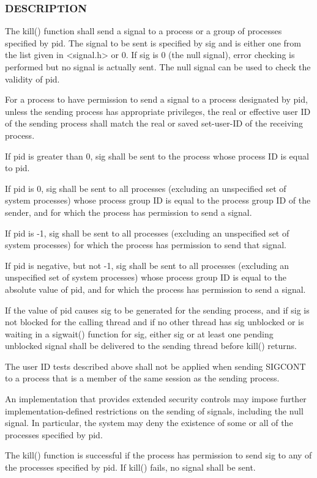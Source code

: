 \subsubsection*{D\+E\+S\+C\+R\+I\+P\+T\+I\+ON}

\begin{DoxyVerb}The kill() function shall send a signal to a process or a group of
processes specified by pid. The signal to be sent is specified by sig
and is either one from the list given in <signal.h> or 0. If sig is 0
(the null signal), error checking is performed but no signal is actually
sent. The null signal can be used to check the validity of pid.

For a process to have permission to send a signal to a process designated
by pid, unless the sending process has appropriate privileges, the real
or effective user ID of the sending process shall match the real or
saved set-user-ID of the receiving process.

If pid is greater than 0, sig shall be sent to the process whose process
ID is equal to pid.

If pid is 0, sig shall be sent to all processes (excluding an unspecified
set of system processes) whose process group ID is equal to the process
group ID of the sender, and for which the process has permission to send
a signal.

If pid is -1, sig shall be sent to all processes (excluding an unspecified
set of system processes) for which the process has permission to send
that signal.

If pid is negative, but not -1, sig shall be sent to all processes
(excluding an unspecified set of system processes) whose process group
ID is equal to the absolute value of pid, and for which the process has
permission to send a signal.

If the value of pid causes sig to be generated for the sending process,
and if sig is not blocked for the calling thread and if no other thread
has sig unblocked or is waiting in a sigwait() function for sig, either
sig or at least one pending unblocked signal shall be delivered to the
sending thread before kill() returns.

The user ID tests described above shall not be applied when sending
SIGCONT to a process that is a member of the same session as the sending
process.

An implementation that provides extended security controls may impose
further implementation-defined restrictions on the sending of signals,
including the null signal. In particular, the system may deny the
existence of some or all of the processes specified by pid.

The kill() function is successful if the process has permission to send
sig to any of the processes specified by pid. If kill() fails, no signal
shall be sent.
\end{DoxyVerb}


